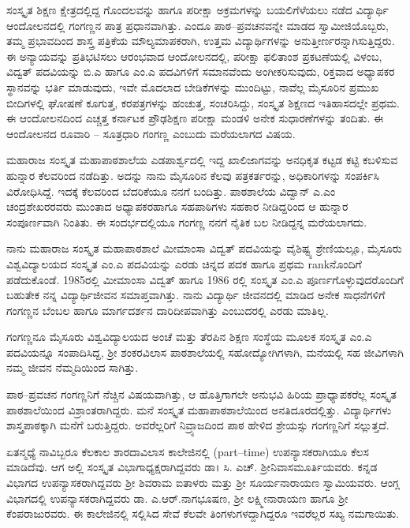 ಸಂಸ್ಕೃತ ಶಿಕ್ಷಣ ಕ್ಷೇತ್ರದಲ್ಲಿದ್ದ ಗೊಂದಲವನ್ನು ಹಾಗೂ ಪರೀಕ್ಷಾ ಅಕ್ರಮಗಳನ್ನು ಬಯಲಿಗೆಳೆಯಲು ನಡೆದ ವಿದ್ಯಾರ್ಥಿ ಆಂದೋಲನದಲ್ಲಿ ಗಂಗಣ್ಣನ ಪಾತ್ರ ಪ್ರಧಾನವಾಗಿತ್ತು. ಎಂದೂ ಪಾಠ–ಪ್ರವಚನ\-ವನ್ನೇ ಮಾಡದ ಸ್ವಾಮೀಜಿಯೊಬ್ಬರು, ತಮ್ಮ  ಪ್ರಭಾವದಿಂದ ಶಾಸ್ತ್ರ ಪತ್ರಿಕೆಯ ಮೌಲ್ಯಮಾಪಕರಾಗಿ, ಉತ್ತಮ ವಿದ್ಯಾರ್ಥಿಗಳನ್ನು ಅನುತ್ತೀರ್ಣರನ್ನಾಗಿಸುತ್ತಿದ್ದರು. 
\newpage
ಈ ಅನ್ಯಾಯವನ್ನು ಪ್ರತಿಭಟಿಸಲು ಆರಂಭವಾದ ಆಂದೋಲನದಲ್ಲಿ, ಪರೀಕ್ಷಾ ಫಲಿತಾಂಶ ಪ್ರಕಟಣೆಯಲ್ಲಿ ವಿಳಂಬ, ವಿದ್ವತ್ ಪದವಿಯನ್ನು ಬಿ.ಎ  ಹಾಗೂ  ಎಂ.ಎ ಪದವಿಗಳಿಗೆ ಸಮಾನವೆಂದು ಅಂಗೀಕರಿಸುವುದು, ರಿಕ್ತವಾದ ಅಧ್ಯಾಪಕರ ಸ್ಥಾನವನ್ನು  ಭರ್ತಿ ಮಾಡುವುದು, ಇವೇ ಮೊದಲಾದ ಬೇಡಿಕೆಗಳನ್ನು ಮುಂದಿಟ್ಟು, ನಾವೆಲ್ಲ ಮೈಸೂರಿನ ಪ್ರಮುಖ ಬೀದಿಗಳಲ್ಲಿ ಘೋಷಣೆ ಕೂಗುತ್ತ, ಕರಪತ್ರಗಳನ್ನು ಹಂಚುತ್ತ, ಸಂಚರಿಸಿದ್ದು, ಸಂಸ್ಕೃತ ಶಿಕ್ಷಣದ ಇತಿಹಾಸದಲ್ಲೇ ಪ್ರಥಮ. ಈ ಆಂದೋಲನದಿಂದ ಎಚ್ಚತ್ತ ಕರ್ನಾಟಕ ಪ್ರೌಢಶಿಕ್ಷಣ ಪರೀಕ್ಷಾ ಮಂಡಳಿ ಅನೇಕ ಸುಧಾರಣೆಗಳನ್ನು ತಂದಿತು. ಈ ಆಂದೋಲನದ ರೂವಾರಿ – ಸೂತ್ರಧಾರಿ ಗಂಗಣ್ಣ  ಎಂಬುದು ಮರೆಯಲಾಗದ ವಿಷಯ.

ಮಹಾರಾಜ ಸಂಸ್ಕೃತ ಮಹಾಪಾಠಶಾಲೆಯ ಎಡಪಾರ್ಶ್ವದಲ್ಲಿ ಇದ್ದ ಖಾಲಿಜಾಗವನ್ನು ಅನಧಿಕೃತ ಕಟ್ಟಡ ಕಟ್ಟಿ ಕಬಳಿಸುವ ಹುನ್ನಾರ ಕೆಲವರಿಂದ ನಡೆದಿತ್ತು. ಅದನ್ನು ನಾನು ಮೈಸೂರಿನ ಕೆಲವು  ಪತ್ರಕರ್ತರನ್ನು, ಅಧಿಕಾರಿಗಳನ್ನು ಸಂಪರ್ಕಿಸಿ ವಿರೋಧಿಸಿದ್ದೆ. ಇದಕ್ಕೆ ಕೆಲವರಿಂದ ಬೆದರಿಕೆಯೂ ನನಗೆ ಬಂದಿತ್ತು. ಪಾಠಶಾಲೆಯ ವಿದ್ವಾನ್ ಎ.ಎಂ ಚಂದ್ರಶೇಖರರವರು ಮುಂತಾದ ಅಧ್ಯಾಪಕರಹಾಗೂ ಸಹಪಾಠಿಗಳು ಸಹಕಾರ ನೀಡಿದ್ದರಿಂದ ಆ ಹುನ್ನಾರ ಸಂಪೂರ್ಣವಾಗಿ ನಿಂತಿತು. ಈ ಸಂದರ್ಭದಲ್ಲಿಯೂ ಗಂಗಣ್ಣ ನನಗೆ ನೈತಿಕ ಬಲ ನೀಡಿದ್ದನ್ನ ಮರೆಯಲಾಗದು.

ನಾನು ಮಹಾರಾಜ ಸಂಸ್ಕೃತ ಮಹಾಪಾಠಶಾಲೆ ಮೀಮಾಂಸಾ ವಿದ್ವತ್ ಪದವಿಯನ್ನು ವೈಶಿಷ್ಟ್ಯ ಶ್ರೇಣಿಯಲ್ಲೂ, ಮೈಸೂರು  ವಿಶ್ವವಿದ್ಯಾಲಯದ ಸಂಸ್ಕೃತ  ಎಂ.ಎ ಪದವಿಯನ್ನು ಎರಡು ಚಿನ್ನದ ಪದಕ ಹಾಗೂ ಪ್ರಥಮ  rankನೊಂದಿಗೆ ಪಡೆದುಕೊಂಡೆ. 1985ರಲ್ಲಿ ಮೀಮಾಂಸಾ ವಿದ್ವತ್ ಹಾಗೂ 1986 ರಲ್ಲಿ ಸಂಸ್ಕೃತ ಎಂ.ಎ ಪೂರ್ಣಗೊಳ್ಳುವುದರೊಂದಿಗೆ ಬಹುತೇಕ ನನ್ನ ವಿದ್ಯಾರ್ಥಿಜೀವನ ಸಮಾಪ್ತವಾಗಿತ್ತು. ನಾನು ವಿದ್ಯಾರ್ಥಿ ಜೀವನದಲ್ಲಿ ಮಾಡಿದ ಅನೇಕ ಸಾಧನೆಗಳಿಗೆ ಗಂಗಣ್ಣನ ಬೆಂಬಲ ಹಾಗೂ ಮಾರ್ಗದರ್ಶನ ದಾರಿದೀಪವಾಗಿತ್ತು ಎಂಬುದರಲ್ಲಿ ಎರಡು ಮಾತಿಲ್ಲ.

ಗಂಗಣ್ಣನೂ ಮೈಸೂರು ವಿಶ್ವವಿದ್ಯಾಲಯದ ಅಂಚೆ ಮತ್ತು ತೆರಪಿನ ಶಿಕ್ಷಣ ಸಂಸ್ಥೆಯ ಮೂಲಕ ಸಂಸ್ಕೃತ ಎಂ.ಎ ಪದವಿಯನ್ನೂ ಸಂಪಾದಿಸಿದ್ದ, ಶ್ರೀ ಶಂಕರವಿಲಾಸ ಪಾಠಶಾಲೆಯಲ್ಲಿ ಸಹೋದ್ಯೋಗಿಗಳಾಗಿ, ಮನೆಯಲ್ಲಿ ಸಹ ಜೀವಿಗಳಾಗಿ ನಮ್ಮ ಜೀವನ ನೆಮ್ಮದಿಯಿಂದ ಸಾಗಿತ್ತು.

ಪಾಠ–ಪ್ರವಚನ ಗಂಗಣ್ಣನಿಗೆ ನೆಚ್ಚಿನ ವಿಷಯವಾಗಿತ್ತು, ಆ ಹೊತ್ತಿಗಾಗಲೇ ಅನುಭವಿ  ಹಿರಿಯ ಪ್ರಾಧ್ಯಾಪಕರೆಲ್ಲ ಸಂಸ್ಕೃತ  ಪಾಠಶಾಲೆಯಿಂದ ವಿಶ್ರಾಂತರಾಗಿದ್ದರು. ಮನೆ ಸಂಸ್ಕೃತ ಮಹಾಪಾಠಶಾಲೆಯಿಂದ ಅನತಿದೂರದಲ್ಲಿತ್ತು. ವಿದ್ಯಾರ್ಥಿಗಳು ಶಾಸ್ತ್ರಪಾಠಕ್ಕಾಗಿ ಮನೆಗೆ ಬರುತ್ತಿದ್ದರು. ಅವರೆಲ್ಲರಿಗೆ ನಿವ್ರ್ಯಾಜದಿಂದ ಪಾಠ ಹೇಳಿದ ಶ್ರೇಯಸ್ಸು ಗಂಗಣ್ಣನಿಗೆ ಸಲ್ಲುತ್ತದೆ.

ಏತನ್ಮಧ್ಯೆ ನಾವಿಬ್ಬರೂ ಕೆಲಕಾಲ ಶಾರದಾವಿಲಾಸ ಕಾಲೇಜಿನಲ್ಲಿ (part–time) ಉಪನ್ಯಾಸಕರಾಗಿಯೂ ಕೆಲಸ ಮಾಡಿದೆವು. ಆಗ ಅಲ್ಲಿ ಸಂಸ್ಕೃತ ವಿಭಾಗಾಧ್ಯಕ್ಷರಾಗಿದ್ದವರು ಡಾ। ಸಿ. ಎಚ್. ಶ್ರೀನಿವಾಸಮೂರ್ತಿಯವರು. ಕನ್ನಡ ವಿಭಾಗದ ಉಪನ್ಯಾಸಕರಾಗಿದ್ದವರು ಶ್ರೀ ಶಿವರಾಮ ಐತಾಳರು ಮತ್ತು ಶ್ರೀ ಸೂರ್ಯನಾರಾಯಣ ಸ್ವಾಮಿಯವರು. ಆಂಗ್ಲ ವಿಭಾಗದಲ್ಲಿ ಉಪನ್ಯಾಸಕರಾಗಿದ್ದವರು ಡಾ. ಎ.ಆರ್.ನಾಗಭೂಷಣ, ಶ್ರೀ ಲಕ್ಷ್ಮೀನಾರಾಯಣ ಹಾಗೂ ಶ್ರೀ ಕೆಂಪರಾಜುರವರು. ಈ ಕಾಲೇಜಿನಲ್ಲಿ ಸಲ್ಲಿಸಿದ ಸೇವೆ ಕೆಲವೇ ತಿಂಗಳುಗಳದ್ದಾಗಿದ್ದರೂ ಇವರೆಲ್ಲರ ಸಖ್ಯ ನಮಗಾಯಿತು. 

